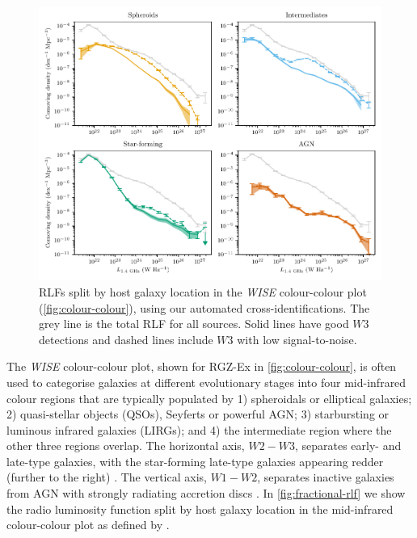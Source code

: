   \begin{figure}
      \centering
    \includegraphics[width=\linewidth]{rlf-images/frlf-ir-colours.pdf}
    \caption[RLFs split by \emph{WISE} colour regions.]{RLFs split by host galaxy
      location in the \emph{WISE} colour-colour plot (\autoref{fig:colour-colour}),
      using our automated cross-identifications. The grey line is the
      total RLF for all sources. Solid lines have good $W3$ detections and dashed lines include $W3$ with low signal-to-noise.
    \label{fig:fractional-rlf}}
  \end{figure}

      The \emph{WISE} colour-colour plot, shown for RGZ-Ex in
      \autoref{fig:colour-colour}, is often used to categorise galaxies at different evolutionary stages into
      four mid-infrared colour regions that are typically populated by 1)
      spheroidals or elliptical galaxies; 2) quasi-stellar objects (QSOs),
      Seyferts or powerful AGN; 3) starbursting or luminous infrared galaxies
      (LIRGs); and 4) the intermediate region where the other three regions
      overlap. The horizontal axis, $W2-W3$, separates early- and late-type galaxies, with the star-forming late-type galaxies appearing redder (further to the right) \citep{wright10wise}. The vertical axis, $W1-W2$, separates inactive galaxies from AGN
      with strongly radiating accretion discs \citep{sadler14radio}. In
      \autoref{fig:fractional-rlf} we show the radio luminosity function split
      by host galaxy location in the mid-infrared colour-colour plot as defined by \citet{jarrett17wise}.

